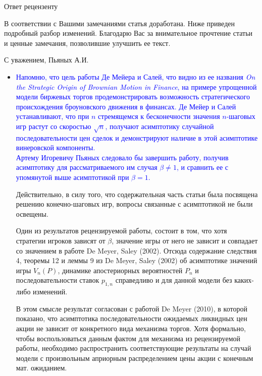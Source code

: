 \documentclass[12pt]{extarticle}
\begin{document}
\begin{center}
{\Large Ответ рецензенту}
\end{center}

В соответствии с Вашими замечаниями статья доработана. Ниже приведен подробный
разбор изменений. Благодарю Вас за внимательное прочтение статьи и ценные
замечания, позволившие улучшить ее текст.

\begin{flushright}
С уважением, Пьяных А.И.
\end{flushright}


\begin{itemize}
\item%

  \textcolor{blue}{%
    Напомню, что цель работы Де Мейера и Салей, что видно из ее названия
    \textit{On the Strategic Origin of Brownian Motion in Finance}, на примере
    упрощенной модели биржевых торгов продемонстрировать возможность
    стратегического происхождения броуновского движения в финансах. Де Мейер и
    Салей устанавливают, что при $n$ стремящемся к бесконечности значения
    $n$-шаговых игр растут со скоростью $\sqrt{n}$, получают асимптотику
    случайной последовательности цен сделок и демонстрируют наличие в этой
    асимптотике винеровской компоненты.\\
    Артему Игоревичу Пьяных следовало бы завершить работу, получив асимптотику
    для рассматриваемого им случая $\beta \neq 1$, и сравнить ее с упомянутой
    выше асимптотикой при $\beta = 1$.}
  
  Действительно, в силу того, что содержательная часть статьи была посвящена
  решению конечно-шаговых игр, вопросы связанные с асимптотикой не были
  освещены.
  
  Один из результатов рецензируемой работы, состоит в том, что хотя стратегии
  игроков зависят от $\beta$, значение игры от него не зависит и совпадает со
  значением в работе De Meyer, Saley (2002). Отсюда содержание следствия 4,
  теоремы 12 и леммы 9 из De Meyer, Saley (2002) об асимптотике значений игры
  $V_n(P)$, динамике апостериорных вероятностей $P_n$ и последовательности
  ставок $p_{1,n}$ справедливо и для данной модели без каких-либо изменений.
  
  В этом смысле результат согласован с работой De Meyer (2010), в которой
  показано, что асимптотика последовательности ожидаемых ликвидных цен акции не
  зависит от конкретного вида механизма торгов. Хотя формально, чтобы
  воспользоваться данным фактом для механизма из рецензируемой работы,
  необходимо распространить соответствующие результаты на случай модели с
  произвольным априорным распределением цены акции с конечным мат. ожиданием.
  

\end{itemize}
\end{document}

